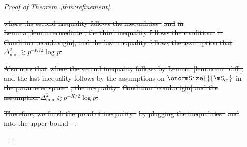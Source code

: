 \documentclass[lettersize,onecolumn,journal]{IEEEtran}
\theoremstyle{definition}
\theoremstyle{definition}
\providecommand{\DIFdeltex}[1]{{\protect\color{red}\sout{#1}}}                      %
\providecommand{\DIFdel}[1]{\texorpdfstring{\DIFdeltex{#1}}{}} %
\begin{document}
\begin{proof}[Proof of Theorem~\ref{thm:refinement}]
\begin{enumerate}
\DIFdel{where the second inequality follows the inequalities~}%
\DIFdel{and }%
\DIFdel{in Lemma~\ref{lem:intermediate}, the third inequality follows the condition~}%
\DIFdel{in Condition~\ref{cond:origin}, and the last inequality follows the assumption that $\Delta_{\min}^2 \gtrsim p^{-K/2}\log p$. 
    }%

\DIFdel{Also note that 
    }%
\DIFdel{where the second inequality follows by Lemma~\ref{lem:norm_diff}, and the last inequality follows by the assumptions on $\onormSize{}{\mS_{a:}}$ in the parameter space~}%
\DIFdel{, the inequality~}%
\DIFdel{Condition~\ref{cond:origin} and the assumption $\Delta_{\min}^2 \gtrsim p^{-K/2}\log p$. 
    }%

\DIFdel{Therefore, we finish the proof of inequality~}%
\DIFdel{by plugging the inequalities~}%
\DIFdel{and }%
\DIFdel{into the upper bound~}%
\DIFdel{.
    }%


\end{enumerate}
\end{proof}
\end{document}
